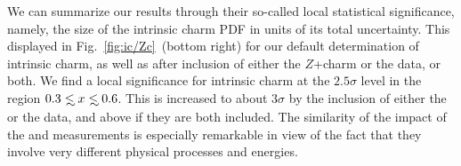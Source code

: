 We can summarize our results  through their so-called local statistical
significance, namely, the size of the intrinsic charm PDF
in units of its total uncertainty.
%
This displayed  in Fig.~\ref{fig:ic/Zc}~(bottom right) for our default determination of
intrinsic charm, as well as after inclusion of either the \lhcb $Z$+charm or the
\emc data, or both.
%
We find a local significance for intrinsic charm at the $2.5\sigma$ level
in the region $0.3 \lsim x \lsim 0.6$.
%
This is increased to about
$3\sigma$ by the inclusion of either the \emc or the \lhcb
data, and above if they are both included.
%
The similarity of the impact of the \emc and \lhcb measurements is
especially remarkable in view of the fact that they involve very
different physical processes and energies.
